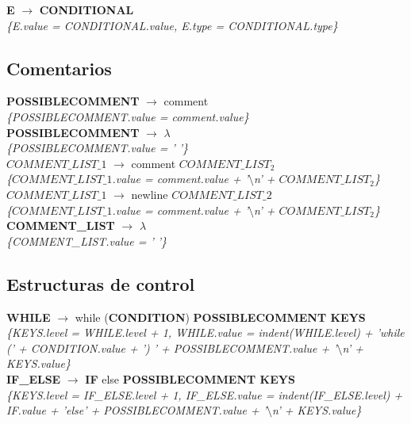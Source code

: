 \documentclass[10pt,a4paper]{article}
\begin{document}
\textbf{E} $\rightarrow$ \textbf{CONDITIONAL} \\
\textit{\{E.value = CONDITIONAL.value, E.type = CONDITIONAL.type\}} \\

\subsection{Comentarios}

\textbf{POSSIBLECOMMENT} $\rightarrow$ comment \\
\textit{\{POSSIBLECOMMENT.value = comment.value\}} \\

\textbf{POSSIBLECOMMENT} $\rightarrow$ $\lambda$ \\
\textit{\{POSSIBLECOMMENT.value = ' '\}} \\

\textbf{$COMMENT\_LIST\_{1}$} $\rightarrow$ comment \textbf{$COMMENT\_LIST_{2}$} \\
\textit{\{$COMMENT\_LIST\_{1}$.value = comment.value + '$\setminus$n' + $COMMENT\_LIST_{2}$\}} \\

\textbf{$COMMENT\_LIST\_{1}$} $\rightarrow$ newline \textbf{$COMMENT\_LIST\_{2}$} \\
\textit{\{$COMMENT\_LIST\_{1}$.value = comment.value + '$\setminus$n' + $COMMENT\_LIST_{2}$\}} \\

\textbf{COMMENT\_LIST} $\rightarrow$ $\lambda$ \\
\textit{\{COMMENT\_LIST.value = ' '\}} \\

\subsection{Estructuras de control}
\textbf{WHILE} $\rightarrow$ while (\textbf{CONDITION}) \textbf{POSSIBLECOMMENT KEYS} \\
\textit{\{KEYS.level = WHILE.level + 1, WHILE.value = indent(WHILE.level) + 'while (' + CONDITION.value + ') ' + POSSIBLECOMMENT.value + '$\setminus$n' + KEYS.value\}} \\

\textbf{IF\_ELSE} $\rightarrow$ \textbf{IF} else \textbf{POSSIBLECOMMENT KEYS} \\
\textit{\{KEYS.level = IF\_ELSE.level + 1, IF\_ELSE.value = indent(IF\_ELSE.level) + IF.value + 'else' + POSSIBLECOMMENT.value + '$\setminus$n' + KEYS.value\}} \\
\end{document}
